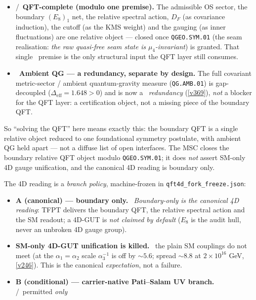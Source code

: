 \documentclass[11pt,a4paper]{article}
\begin{document}
\begin{keybox}
\begin{itemize}\setlength\itemsep{1pt}
\item \mE/\mC\ \textbf{QFT-complete (modulo one premise).} The admissible OS sector, the boundary
  $(E_8)_1$ net, the relative spectral action, $D_F$ (as covariance induction), the cutoff (as the KMS
  weight) and the gauging (as inner fluctuations) are one relative object --- closed once
  \texttt{QGEO.SYM.01} (the seam realisation: \emph{the raw quasi-free seam state is $\mu_4$-invariant}) is
  granted. That single \mO\ premise is the only structural input the QFT layer still consumes.
\item \mC\ \textbf{Ambient QG --- a redundancy, separate by design.} The full covariant metric-sector / ambient
  quantum-gravity measure (\texttt{QG.AMB.01}) is gap-decoupled ($\Delta_{\mathrm{eff}}=1.648>0$) and is now a
  \mC\ \emph{redundancy} (\vref{v369}), \emph{not} a blocker for the QFT layer: a certification object, not a
  missing piece of the boundary QFT.
\end{itemize}
So ``solving the QFT'' here means exactly this: the boundary QFT is a single relative object reduced to
one foundational symmetry postulate, with ambient QG held apart --- not a diffuse list of open interfaces.
The MSC closes the boundary relative QFT object modulo \texttt{QGEO.SYM.01}; it does \emph{not} assert
SM-only 4D gauge unification, and the canonical 4D reading is boundary only.
\begin{keybox}
The 4D reading is a \emph{branch policy}, machine-frozen in \texttt{qft4d\_fork\_freeze.json}:
\begin{itemize}\setlength\itemsep{1pt}
\item \textbf{A (canonical) --- boundary only.} \mC\ \emph{Boundary-only is the canonical 4D reading}:
  TFPT delivers the boundary QFT, the relative spectral action and the SM readout; a 4D-GUT is
  \emph{not claimed by default} ($E_8$ is the audit hull, never an unbroken 4D gauge group).
\item \textbf{SM-only 4D-GUT unification is killed.} \mX\ the plain SM couplings do not meet (at the
  $\alpha_1{=}\alpha_2$ scale $\alpha_3^{-1}$ is off by ${\sim}5.6$; spread ${\sim}8.8$ at $2{\times}10^{16}$
  GeV, \vref{v246}). This is the canonical \emph{expectation}, not a failure.
\item \textbf{B (conditional) --- carrier-native Pati--Salam UV branch.} \mC/\mO\ permitted \emph{only}

\end{itemize}
\end{keybox}
\end{keybox}
\end{document}
